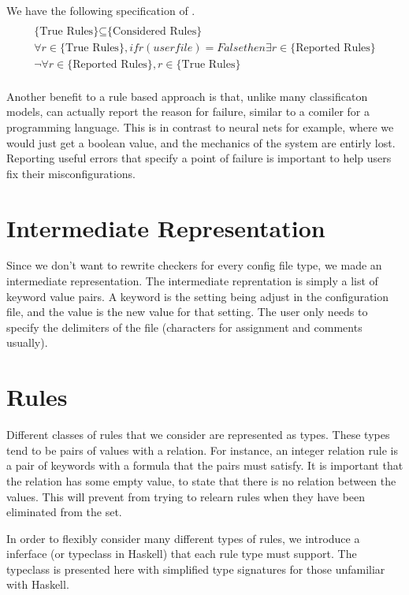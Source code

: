 We have the following specification of \app.
\begin{multline*}\\
\text{\{True Rules\}} \subseteq \text{\{Considered Rules\}} \\
\forall r \in \text{\{True Rules\}}, if r(userfile)=False then \exists r \in \text{\{Reported Rules\}} \\
\neg \forall r \in \text{\{Reported Rules\}}, r \in \text{\{True Rules\}} \\
\end{multline*}

Another benefit to a rule based approach is that, unlike many classificaton models, \app can actually report the reason for failure, similar to a comiler for a programming language.
This is in contrast to neural nets for example, where we would just get a boolean value, and the mechanics of the system are entirly lost.
Reporting useful errors that specify a point of failure is important to help users fix their misconfigurations.

\section{Intermediate Representation}

Since we don't want to rewrite checkers for every config file type, we made an intermediate representation.
The intermediate reprentation is simply a list of keyword value pairs.
A keyword is the setting being adjust in the configuration file, and the value is the new value for that setting.
The user only needs to specify the delimiters of the file (characters for assignment and comments usually).

\section{Rules}

Different classes of rules that we consider are represented as types.
These types tend to be pairs of values with a relation.
For instance, an integer relation rule is a pair of keywords with a formula that the pairs must satisfy.
It is important that the relation has some empty value, to state that there is no relation between the values.
This will prevent \app from trying to relearn rules when they have been eliminated from the set.

In order to flexibly consider many different types of rules, we introduce a inferface (or typeclass in Haskell) that each rule type must support.
The typeclass is presented here with simplified type signatures for those unfamiliar with Haskell.

